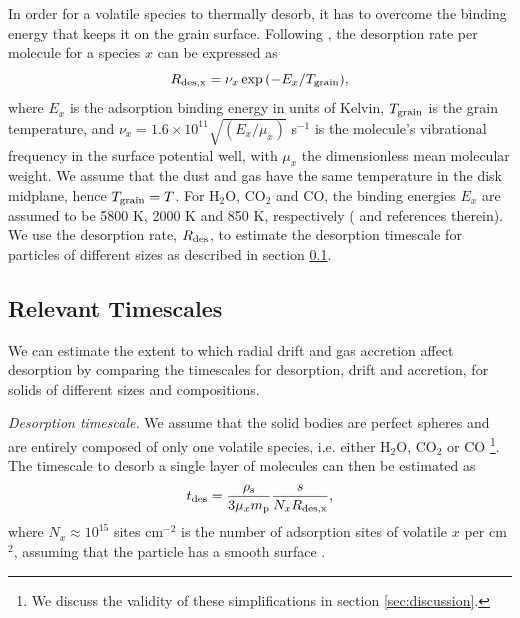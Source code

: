 \documentclass[apj]{emulateapj}
\newcommand{\emgr}[1]{\emph{ \color{gray} #1}}
\begin{document}

In order for a volatile species to thermally desorb, it has to overcome the binding energy that keeps it on the grain surface. Following \citet{hollenbach09}, the desorption rate per molecule for a species $x$ can be expressed as
\begin{equation}
\label{eq:Rdes}
R_{\rm{des}, x} = \nu_x \exp{(-E_x/T_{\rm grain})},
\end{equation}
where $E_x$ is the adsorption binding energy in units of Kelvin, $T_{\rm grain}$ is the grain temperature, and $\nu_x=1.6 \times 10^{11} \sqrt{(E_x/\mu_x)}$ s$^{-1}$ is the molecule's vibrational frequency in the surface potential well, with $\mu_x$ the dimensionless mean molecular weight. We assume that the dust and gas have the same temperature in the disk midplane, hence $T_{\rm grain}=T$. For H$_2$O, CO$_2$ and CO, the binding energies $E_x$ are assumed to be 5800 K, 2000 K and 850 K, respectively (\citealt{oberg11} and references therein). We use the desorption rate, $R_{\rm des}$, to estimate the desorption timescale for particles of different sizes as described in section \ref{sec:timescales}. 




\subsection{Relevant Timescales}
\label{sec:timescales}

We can estimate the extent to which radial drift and gas accretion affect desorption by comparing the timescales for desorption, drift and accretion, for solids of different sizes and compositions. 

\textit{Desorption timescale.} We assume that the solid bodies are perfect spheres and are entirely composed of only one volatile species, i.e. either H$_2$O, CO$_2$ or CO \footnote{We discuss the validity of these simplifications in section \ref{sec:discussion}.}. The timescale to desorb a single layer of molecules can then be estimated as
\begin{equation}
\label{eq:tdes}
t_{\rm des}=\frac{\rho_{\rm s}}{3 \mu_x m_{\rm p}} \frac{s}{N_x R_{\rm des, x}},
\end{equation}
where $N_x \approx 10^{15}$ sites cm$^{-2}$ is the number of adsorption sites of volatile $x$ per cm$^2$, assuming that the particle has a smooth surface \citep{hollenbach09}. 
\end{document}
